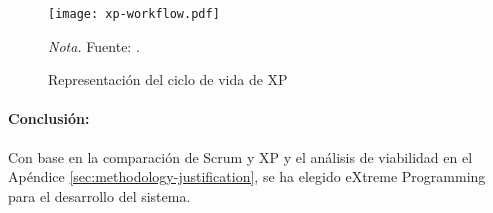 \begin{figure}
    \centering
    \caption{Representación del ciclo de vida de XP}\label{fig:xpWorkflowA}
    \texttt{[image: xp-workflow.pdf]}

    \vspace{0.5em}
    \begin{minipage}{\textwidth}
        \small\textit{Nota.} Fuente: \textcite{abrahamsson2017agile}.
    \end{minipage}
\end{figure}

\paragraph{Conclusión:}
Con base en la comparación de Scrum y XP y el análisis de viabilidad en el Apéndice \ref{sec:methodology-justification}, se ha elegido eXtreme Programming para el desarrollo del sistema.
